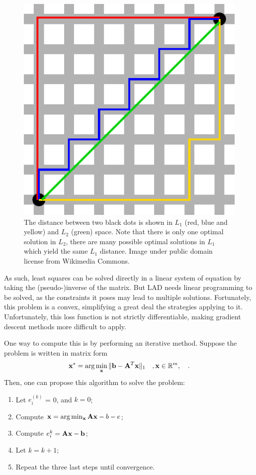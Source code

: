 \documentclass{report}
\begin{document}
\begin{figure}
  \centering
  \includegraphics[width=0.45\linewidth]{q5b_manhattan_distance.pdf}
  \caption[ Examples of $L_1$ and $L_2$ distances ]
   {The distance between two black dots is shown in $L_1$ (red, blue and yellow) and $L_2$ (green) space. Note that there is only one optimal solution in $L_2$, there are many possible optimal solutions in $L_1$ which yield the same $L_1$ distance. Image under public domain license from Wikimedia Commons.}
   \label{q5b:paths}
\end{figure}

As such, least squares can be solved directly in a linear system of equation by taking the (pseudo-)inverse of the matrix. But LAD needs linear programming to be solved, as the constraints it poses may lead to multiple solutions. Fortunately, this problem is a convex, simplifying a great deal the strategies applying to it. Unfortunately, this loss function is not strictly differentiable, making gradient descent methods more difficult to apply.

One way to compute this is by performing an iterative method. Suppose the problem is written in matrix form
\begin{equation}
\mathbf{x}^* = \arg \min_{\mathbf{x}} \| \mathbf{b} - \mathbf{A}^T\mathbf{x} \|_1 \quad, \mathbf{x} \in \mathbb{R}^m,
\quad.
\end{equation}
Then, one can propose this algorithm to solve the problem:
\begin{enumerate}
  \item Let $e_i^(k)$ = 0, and $k = 0$;
  \item Compute $\mathbf{x} = \arg \min_{\mathbf{x}} \mathbf{Ax} - b - e$;
  \item Compute $e_i^{k} = \mathbf{Ax} - \mathbf{b}$;
  \item Let $k = k + 1$;
  \item Repeat the three last steps until convergence.
\end{enumerate}
\end{document}
